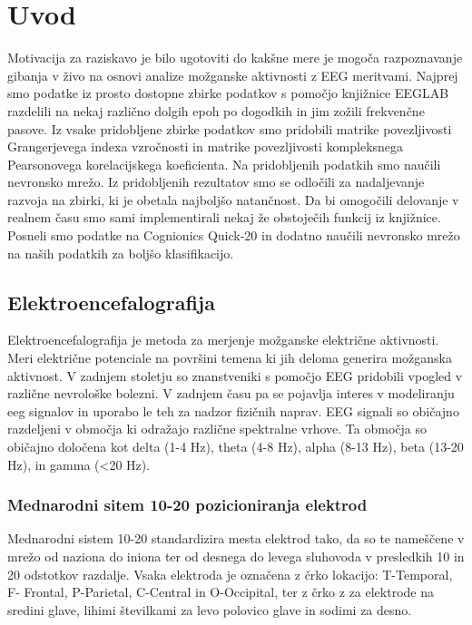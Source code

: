 \chapter{Uvod}
\thispagestyle{fancy}
Motivacija za raziskavo je bilo ugotoviti do kakšne mere je mogoča razpoznavanje gibanja v živo na osnovi analize možganske aktivnosti z EEG meritvami. Najprej smo podatke iz prosto dostopne zbirke podatkov s pomočjo knjižnice EEGLAB razdelili na nekaj različno dolgih epoh po dogodkih in jim zožili frekvenčne pasove. Iz vsake pridobljene zbirke podatkov smo pridobili matrike povezljivosti Grangerjevega indexa vzročnosti in matrike povezljivosti kompleksnega Pearsonovega korelacijskega koeficienta. Na pridobljenih podatkih smo naučili nevronsko mrežo. Iz pridobljenih rezultatov smo se odločili za nadaljevanje razvoja na zbirki, ki je obetala najboljšo natančnost. Da bi omogočili delovanje v realnem času smo sami implementirali nekaj že obstoječih funkcij iz knjižnice. Posneli smo podatke na Cognionics Quick-20 in dodatno naučili nevronsko mrežo na naših podatkih za boljšo klasifikacijo.


\section{Elektroencefalografija}
Elektroencefalografija je metoda za merjenje možganske električne aktivnosti. Meri električne potenciale na površini temena ki jih deloma generira možganska aktivnost. V zadnjem stoletju so znanstveniki s pomočjo EEG pridobili vpogled v različne nevrološke bolezni. V zadnjem času pa se pojavlja interes v modeliranju eeg signalov in uporabo le teh za nadzor fizičnih naprav. EEG signali so običajno razdeljeni v območja ki odražajo različne spektralne vrhove. Ta območja so običajno določena kot delta (1-4 Hz), theta (4-8 Hz), alpha (8-13 Hz), beta (13-20 Hz), in gamma (<20 Hz). 
 \cite{nunez_electroencephalography_2016}

\subsection{Mednarodni sitem 10-20 pozicioniranja elektrod}
Mednarodni sistem 10-20 standardizira mesta elektrod tako, da so te  nameščene v mrežo od naziona do iniona ter od desnega do levega sluhovoda v presledkih 10 in 20 odstotkov razdalje. Vsaka elektroda je označena z črko lokacijo: T-Temporal, F- Frontal, P-Parietal, C-Central in O-Occipital, ter z črko z za elektrode na sredini glave, lihimi številkami za levo polovico glave in sodimi za desno. \cite{klem_ten-twenty_1999}

